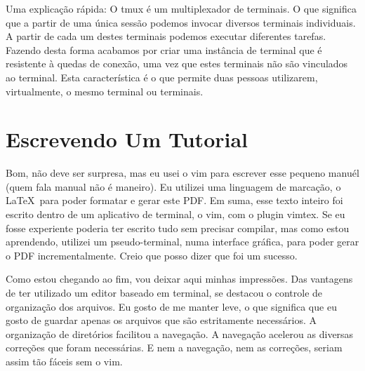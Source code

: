 Uma explicação rápida:
O tmux é um multiplexador de terminais. O que significa que a partir de uma única sessão
podemos invocar diversos terminais individuais.
A partir de cada um destes terminais podemos executar diferentes tarefas.
Fazendo desta forma acabamos por criar uma instância de terminal que é resistente à quedas de conexão,
uma vez que estes terminais não são vinculados ao terminal.
Esta característica é o que permite duas pessoas utilizarem, virtualmente, o mesmo terminal ou terminais.

\section{Escrevendo Um Tutorial}
Bom, não deve ser surpresa, mas eu usei o vim para escrever esse pequeno manuél (quem fala manual não é maneiro).
Eu utilizei uma linguagem de marcação, o \LaTeX\ para poder formatar e gerar este PDF.
Em suma, esse texto inteiro foi escrito dentro de um aplicativo de terminal, o vim, com o plugin vimtex.
Se eu fosse experiente poderia ter escrito tudo sem precisar compilar, mas como estou aprendendo,
utilizei um pseudo-terminal, numa interface gráfica, para poder gerar o PDF incrementalmente.
Creio que posso dizer que foi um sucesso.

Como estou chegando ao fim, vou deixar aqui minhas impressões.
Das vantagens de ter utilizado um editor baseado em terminal, se destacou o controle de organização dos arquivos.
Eu gosto de me manter leve, o que significa que eu gosto de guardar apenas os arquivos que são estritamente necessários.
A organização de diretórios facilitou a navegação.
A navegação acelerou as diversas correções que foram necessárias.
E nem a navegação, nem as correções, seriam assim tão fáceis sem o vim.
